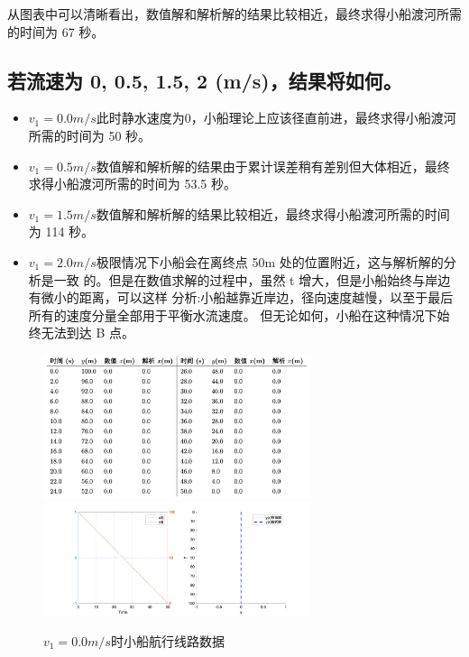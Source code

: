 \documentclass{article}
\begin{document}
从图表中可以清晰看出，数值解和解析解的结果比较相近，最终求得小船渡河所需的时间为 67 秒。


\subsection{若流速为 0, 0.5, 1.5, 2 (m/s)，结果将如何。}
\begin{itemize}
\item{\textbf{$v_1=0.0m/s$}此时静水速度为0，小船理论上应该径直前进，最终求得小船渡河所需的时间为 50 秒。}
\item{\textbf{$v_1=0.5m/s$}数值解和解析解的结果由于累计误差稍有差别但大体相近，最终求得小船渡河所需的时间为 53.5 秒。}

\item{\textbf{$v_1=1.5m/s$}数值解和解析解的结果比较相近，最终求得小船渡河所需的时间为 114 秒。}
\item{\textbf{$v_1=2.0m/s$}极限情况下小船会在离终点 50m 处的位置附近，这与解析解的分析是一致 的。但是在数值求解的过程中，虽然 t 增大，但是小船始终与岸边有微小的距离，可以这样 分析:小船越靠近岸边，径向速度越慢，以至于最后所有的速度分量全部用于平衡水流速度。 但无论如何，小船在这种情况下始终无法到达 B 点。
}
\end{itemize}

\begin{figure}[H]
    \centering
    \includegraphics[width=0.7\textwidth]{v0.png}
    \includegraphics[width=0.7\textwidth]{pic3.png}
    \caption{$v_1=0.0m/s$时小船航行线路数据}
\end{figure}
\end{document}

